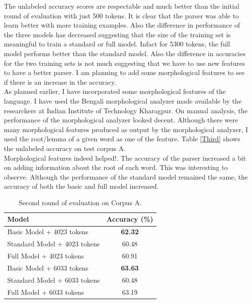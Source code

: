 \documentclass[11pt,letterpaper]{article}
\begin{document}
The unlabeled accuracy scores are respectable and much better than the initial round of evaluation with just 500 tokens. It is clear that the parser was able to learn better with more training examples. Also the difference in performance of the three models has decreased suggesting that the size of the training set is meaningful to train a standard or full model. Infact for 5300 tokens, the full model performs better than the standard model. Also the difference in accuracies for the two training sets is not much suggesting that we have to use new features to have a better parser. I am planning to add some morphological features to see if there is an increase in the accuracy.\\

As planned earlier, I have incorporated some morphological features of the language. I have used the Bengali morphological analyzer \citep{BMA} made available by the researchers at Indian Institute of Technology Kharagpur. On manual analysis, the performance of the morphological analyzer looked decent. Although there were many morphological features produced as output by the morphological analyzer, I used the root/lemma of a given word as one of the feature. Table \ref{Third} shows the unlabeled accuracy on test corpus A. \\

Morphological features indeed helped!. The accuracy of the parser increased a bit on adding information about the root of each word. This was interesting to observe. Although the performance of the standard model remained the same, the accuracy of both the basic and full model increased. 


\begin{table}
\begin{center}
  \begin{tabular}{ l || c }
  \hline
  Model & Accuracy (\%)\\
  \hline
  Basic Model + 4023 tokens & \textbf{62.32} \\
  Standard Model + 4023 tokens & 60.48 \\
  Full Model + 4023 tokens & 60.91 \\
  \hline
  Basic Model + 6033 tokens & \textbf{63.63} \\
  Standard Model + 6033 tokens & 60.48\\
  Full Model + 6033 tokens & 63.19\\
  \hline
   \end{tabular}
\end{center}
\caption{Second round of evaluation on Corpus A.}
\label{Second}
\end{table}
\end{document}
